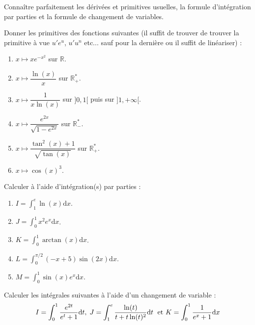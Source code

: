\documentclass[a4paper,twoside,french,10pt]{VcCours}
\newcommand{\dx}{\text{d}x}
\newcommand{\dt}{\text{d}t}
\begin{document}
\begin{ptc}{}
	Connaître parfaitement les dérivées et primitives usuelles, la formule d'intégration par parties et la formule de changement de variables.
\end{ptc}

\medskip

\begin{Exercice}{}\end{Exercice} Donner les primitives des fonctions suivantes (il suffit de trouver de trouver la primitive \og à vue \fg $u'e^{u}$, $u'u^n$ etc... sauf pour la dernière ou il suffit de linéariser) :

\begin{multicols}{2}
\begin{enumerate}
\item $x \mapsto xe^{-x^2}$ sur $\mathbb{R}$.
\item $x \mapsto \dfrac{\ln(x)}{x}$ sur $\mathbb{R}_{+}^*$.
\item $x \mapsto \dfrac{1}{x\ln(x)}$ sur $]0,1[$ puis sur $]1, + \infty[$.
\columnbreak
\item $x \mapsto \dfrac{e^{2x}}{\sqrt{1-e^{2x}}}$ sur $\mathbb{R}_{-}^*$.
\item $x \mapsto \dfrac{\tan^2(x)+1}{\sqrt{\tan(x)}}$ sur $\mathbb{R}_{+}^*$.
\item $x \mapsto \cos(x)^3$.
\end{enumerate}
\end{multicols}

\medskip

\begin{Exercice}{}\end{Exercice} Calculer à l'aide d'intégration(s) par parties :

\begin{multicols}{2}
\begin{enumerate}
\item $I= \int_{1}^e \ln(x) \dx$.
\item $J= \int_{0}^1 x^2 e^x \dx$.
\item $K = \int_{0}^{1} \arctan(x) \dx$.
\columnbreak
\item $L = \int_{0}^{\pi/2} (-x+5) \sin(2x) \dx$.
\item $M = \int_{0}^1 \sin(x) e^x \dx$.
\end{enumerate}
\end{multicols}

\medskip

\begin{Exercice}{}\end{Exercice} Calculer les intégrales suivantes à l'aide d'un changement de variable :
$$I= \int_{0}^1 \dfrac{e^{2t}}{e^t+1} \dt, \; J = \int_{1}^e \dfrac{\ln(t)}{t+t\ln(t)^2} \dt \; \hbox{ et } K = \int_{0}^1 \dfrac{1}{e^x+1} \dx$$
\end{document}
